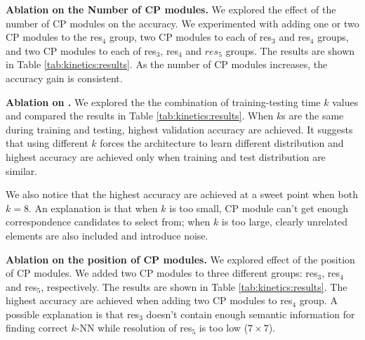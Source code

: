 \documentclass[10pt,twocolumn,letterpaper]{article}
\begin{document}
\textbf{Ablation on the Number of CP modules.} We explored the effect of the number of CP modules on the accuracy. We experimented with adding one or two CP modules to the res$_4$ group, two CP modules to each of res$_3$ and res$_4$ groups, and two CP modules to each of  res$_3$, res$_4$ and $res_5$ groups. The results are shown in Table \ref{tab:kinetics:results}. As the number of CP modules increases, the accuracy gain is consistent.

\textbf{Ablation on .} We explored the the combination of training-testing time $k$ values and compared the results in Table \ref{tab:kinetics:results}. When $k$s are the same during training and testing, highest validation accuracy are achieved. It suggests that using different $k$ forces the architecture to learn different distribution and highest accuracy are achieved only when training and test distribution are similar. 

We also notice that the highest accuracy are achieved at a sweet point when both $k=8$. An explanation is that when $k$ is too small, CP module can't get enough correspondence candidates to select from; when $k$ is too large, clearly unrelated elements are also included and introduce noise.


\textbf{Ablation on the position of CP modules.} We explored effect of the position of CP modules. We added two CP modules to three different groups: res$_3$, res$_4$ and res$_5$, respectively. The results are shown in Table \ref{tab:kinetics:results}. The highest accuracy are achieved when adding two CP modules to res$_4$ group. A possible explanation is that res$_3$ doesn't contain enough semantic information for finding correct $k$-NN while resolution of res$_5$  is too low ($7\times7$).
\end{document}
